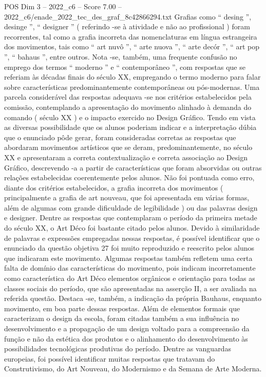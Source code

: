 \begin{textsample}{POS Dim 3 – 2022\_c6 – Score 7.00 – 2022\_c6/enade\_2022\_tec\_des\_graf\_8c42866294.txt}
Grafias como “ desing ”, desinge ”, “ designer ” ( referindo -se à atividade e não ao profissional ) foram recorrentes, tal como a grafia incorreta das nomenclaturas em língua estrangeira dos movimentos, tais como “ art nuvô ”, “ arte nuova ”, “ arte decór ”, “ art pop ”, “ bahaus ”, entre outros.
Nota -se, também, uma frequente confusão no emprego dos termos “ moderno ” e “ contemporâneo ”, com respostas que se referiam às décadas finais do século XX, empregando o termo moderno para falar sobre características predominantemente contemporâneas ou pós-modernas.
Uma parcela considerável das respostas adequava -se nos critérios estabelecidos pela comissão, contemplando a apresentação do movimento alinhado à demanda do comando ( século XX ) e o impacto exercido no Design Gráfico.
Tendo em vista as diversas possibilidade que os alunos poderiam indicar e a interpretação dúbia que o enunciado pôde gerar, foram consideradas corretas as respostas que abordaram movimentos artísticos que se deram, predominantemente, no século XX e apresentaram a correta contextualização e correta associação ao Design Gráfico, descrevendo -a a partir de características que foram absorvidas ou outras relações estabelecidas coerentemente pelos alunos.
Não foi pontuada como erro, diante dos critérios estabelecidos, a grafia incorreta dos movimentos ( principalmente a grafia de art nouveau, que foi apresentada em várias formas, além de algumas com grande dificuldade de legibilidade ) ou das palavras design e designer.
Dentre as respostas que contemplaram o período da primeira metade do século XX, o Art Déco foi bastante citado pelos alunos.
Devido à similaridade de palavras e expressões empregadas nessas respostas, é possível identificar que o enunciado da questão objetiva 27 foi muito reproduzido e reescrito pelos alunos que indicaram este movimento.
Algumas respostas também refletem uma certa falta de domínio das características do movimento, pois indicam incorretamente como característica do Art Déco elementos orgânicos e orientação para todas as classes sociais do período, que são apresentadas na asserção II, a ser avaliada na referida questão.
Destaca -se, também, a indicação da própria Bauhaus, enquanto movimento, em boa parte dessas respostas.
Além de elementos formais que caracterizam o design da escola, foram citadas também a sua influência no desenvolvimento e a propagação de um design voltado para a compreensão da função e não da estética dos produtos e o alinhamento do desenvolvimento às possibilidades tecnológicas produtivas do período.
Dentre as vanguardas europeias, foi possível identificar muitas respostas que tratavam do Construtivismo, do Art Nouveau, do Modernismo e da Semana de Arte Moderna.

\end{textsample}
